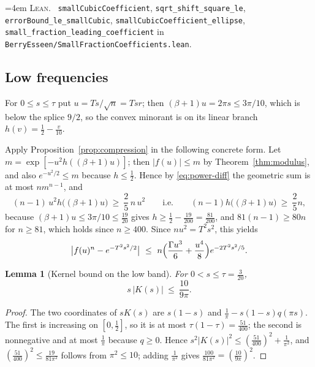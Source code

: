 \documentclass[10pt,a4paper]{article}
\theoremstyle{plain}
\newtheorem{lemma}[theorem]{Lemma}
\theoremstyle{definition}
\newcommand{\lean}[1]{\texttt{#1}}
\newcommand{\file}[1]{\texttt{#1}}
\newenvironment{leanref}%
  {\par\addvspace{3pt}\begingroup\sloppy\emergencystretch=4em
   \noindent\footnotesize\textsc{Lean.}\ \ignorespaces}%
  {\par\endgroup\addvspace{3pt}}
\begin{document}
\begin{leanref}
\lean{smallCubicCoefficient}, \lean{sqrt\_shift\_square\_le},
\lean{errorBound\_le\_smallCubic},
\lean{smallCubicCoefficient\_ellipse},
\lean{small\_fraction\_leading\_coefficient} in
\file{BerryEsseen/SmallFractionCoefficients.lean}.
\end{leanref}

\subsection{Low frequencies}

For $0\le s\le\tau$ put $u=Ts/\sqrt n=Tsr$; then $(\beta+1)u=2\pi s\le3\pi/10$,
which is below the splice $9/2$, so the convex minorant is on its linear branch
$h(v)=\tfrac12-\tfrac v{10}$.

Apply Proposition~\ref{prop:compression} in the following concrete form. Let
$m=\exp[-u^2h((\beta+1)u)]$; then $|f(u)|\le m$ by
Theorem~\ref{thm:modulus}, and also $e^{-u^2/2}\le m$ because $h\le\tfrac12$.
Hence by \eqref{eq:power-diff} the geometric sum is at most $nm^{n-1}$, and
\[
  (n-1)\,u^2h\bigl((\beta+1)u\bigr) \ \ge\ \frac{2}{5}\,n\,u^2
  \qquad\text{i.e.}\qquad
  (n-1)h\bigl((\beta+1)u\bigr) \ \ge\ \frac25 n ,
\]
because $(\beta+1)u\le3\pi/10\le\tfrac{19}{20}$ gives
$h\ge\tfrac12-\tfrac{19}{200}=\tfrac{81}{200}$, and $81(n-1)\ge80n$ for
$n\ge81$, which holds since $n\ge400$. Since $nu^2=T^2s^2$, this yields
\begin{equation}\label{eq:small-power}
  \bigl|f(u)^n-e^{-T^2s^2/2}\bigr|
  \ \le\ n\Bigl(\frac{\Gamma u^3}{6}+\frac{u^4}{8}\Bigr)e^{-2T^2s^2/5} .
\end{equation}

\begin{lemma}[Kernel bound on the low band]\label{lem:small-kernel}
For $0<s\le\tau=\tfrac3{20}$,
\[
  s\,|K(s)| \ \le\ \frac{10}{9\pi}.
\]
\end{lemma}

\begin{proof}
The two coordinates of $sK(s)$ are $s(1-s)$ and
$\tfrac1\pi-s(1-s)q(\pi s)$. The first is increasing on $[0,\tfrac12]$, so it
is at most $\tau(1-\tau)=\tfrac{51}{400}$; the second is nonnegative and at
most $\tfrac1\pi$ because $q\ge0$. Hence
$s^2|K(s)|^2\le(\tfrac{51}{400})^2+\tfrac1{\pi^2}$, and
$(\tfrac{51}{400})^2\le\tfrac{19}{81\pi^2}$ follows from $\pi^2\le10$; adding
$\tfrac1{\pi^2}$ gives $\tfrac{100}{81\pi^2}=(\tfrac{10}{9\pi})^2$.
\end{proof}
\end{document}
